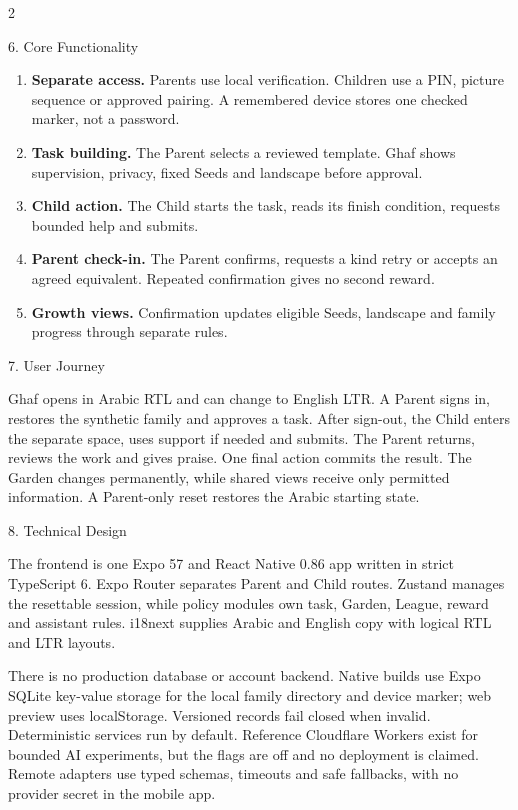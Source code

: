 \documentclass[11pt,a4paper]{article}
\newcommand{\briefsection}[2]{%
  \vspace{1.5pt}%
  {\displayfont\fontsize{10.8}{12.4}\selectfont\color{Ghaf}#1. #2}\par
  \vspace{0.3pt}%
}
\begin{document}
\vspace{0.2mm}
\begin{multicols}{2}

\briefsection{6}{Core Functionality}
\begin{enumerate}[leftmargin=*,label=\textbf{\arabic*.},itemsep=0.8pt,topsep=0.5pt]
  \item \textbf{Separate access.} Parents use local verification. Children use a PIN, picture sequence or approved pairing. A remembered device stores one checked marker, not a password.
  \item \textbf{Task building.} The Parent selects a reviewed template. Ghaf shows supervision, privacy, fixed Seeds and landscape before approval.
  \item \textbf{Child action.} The Child starts the task, reads its finish condition, requests bounded help and submits.
  \item \textbf{Parent check-in.} The Parent confirms, requests a kind retry or accepts an agreed equivalent. Repeated confirmation gives no second reward.
  \item \textbf{Growth views.} Confirmation updates eligible Seeds, landscape and family progress through separate rules.
\end{enumerate}

\briefsection{7}{User Journey}
Ghaf opens in Arabic RTL and can change to English LTR. A Parent signs in, restores the synthetic family and approves a task. After sign-out, the Child enters the separate space, uses support if needed and submits. The Parent returns, reviews the work and gives praise. One final action commits the result. The Garden changes permanently, while shared views receive only permitted information. A Parent-only reset restores the Arabic starting state.

\briefsection{8}{Technical Design}
The frontend is one Expo 57 and React Native 0.86 app written in strict TypeScript 6. Expo Router separates Parent and Child routes. Zustand manages the resettable session, while policy modules own task, Garden, League, reward and assistant rules. i18next supplies Arabic and English copy with logical RTL and LTR layouts.

There is no production database or account backend. Native builds use Expo SQLite key-value storage for the local family directory and device marker; web preview uses localStorage. Versioned records fail closed when invalid. Deterministic services run by default. Reference Cloudflare Workers exist for bounded AI experiments, but the flags are off and no deployment is claimed. Remote adapters use typed schemas, timeouts and safe fallbacks, with no provider secret in the mobile app.


\end{multicols}
\end{document}
